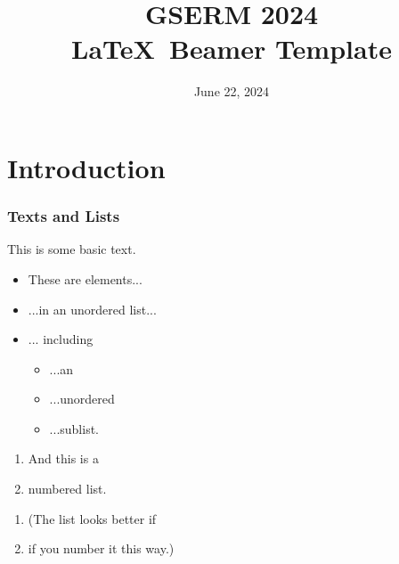 \documentclass[10pt]{beamer}
\newcommand{\nin}{\noindent}
\newcommand{\be}{\begin{enumerate}}
\newcommand{\ee}{\end{enumerate}}
\newcommand{\bi}{\begin{itemize}}
\newcommand{\ei}{\end{itemize}}
\newcommand{\+}{\item}
\newcommand{\?}{\item[$\cdot$]}
\newcommand{\0}{\mathbf{0}}
\newcommand{\1}{\mathbf{1}}
\begin{document}

\title{\huge {\bf GSERM 2024} \\ \LaTeX~Beamer Template}
\date{June 22, 2024}

\frame{\titlepage}  %


\section{Introduction}

\begin{frame}[fragile] \frametitle{Texts and Lists}

\nin This is some basic text.

\bi

\+ These are elements...

\+ ...in an unordered list...

\+ ... including
   \bi
   \? ...an
   \? ...unordered
   \? ...sublist. 
   \ei
\ei

\be
\+ And this is a 
\+ numbered list.
\ee

\be
\+[1.] (The list looks better if 
\+[2.] if you number it this way.)
\ee


\end{frame}
\end{document}
